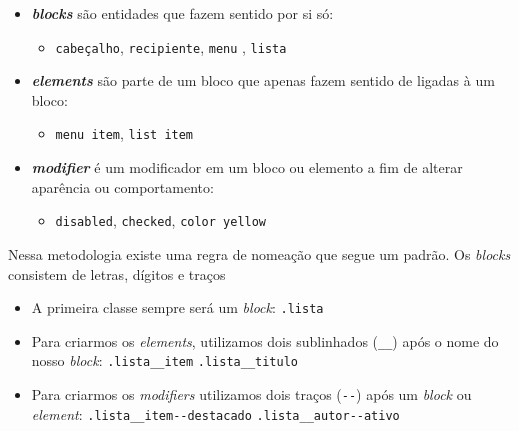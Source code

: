 \begin{itemize}
\tightlist
\item
  \textbf{\emph{blocks}} são entidades que fazem sentido por si só:

  \begin{itemize}
  \tightlist
  \item
    \texttt{cabeçalho}, \texttt{recipiente}, \texttt{menu} , \texttt{lista}
  \end{itemize}
\item
  \textbf{\emph{elements}} são parte de um bloco que apenas fazem
  sentido de ligadas à um bloco:

  \begin{itemize}
  \tightlist
  \item
    \texttt{menu\ item}, \texttt{list\ item}
  \end{itemize}
\item
  \textbf{\emph{modifier}} é um modificador em um bloco ou elemento a
  fim de alterar aparência ou comportamento:

  \begin{itemize}
  \tightlist
  \item
    \texttt{disabled}, \texttt{checked}, \texttt{color\ yellow}
  \end{itemize}
\end{itemize}

Nessa metodologia existe uma regra de nomeação que segue um padrão. Os
\emph{blocks} consistem de letras, dígitos e traços

\begin{itemize}
\tightlist
    \item 
        A primeira classe sempre será um \emph{block}: \texttt{.lista}
        
    \item
        Para criarmos os \emph{elements}, utilizamos dois sublinhados (\texttt{\_\_}) após o nome do nosso \emph{block}: \texttt{.lista\_\_item}   \texttt{.lista\_\_titulo}
        
    \item
        Para criarmos os \emph{modifiers} utilizamos dois traços (\texttt{-{}-}) após um \emph{block} ou \emph{element}:  \texttt{.lista\_\_item-{}-destacado}   \texttt{.lista\_\_autor-{}-ativo}
        
\end{itemize}

